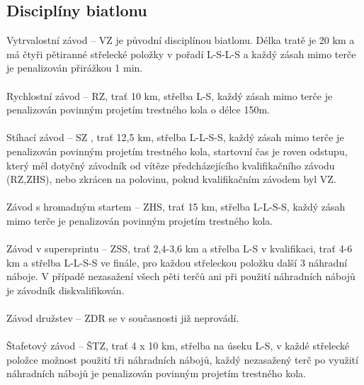 \documentclass{article}
\begin{document}
\subsection{Disciplíny biatlonu}
Vytrvalostní závod – VZ je původní disciplínou biatlonu. Délka tratě je 20 km a má čtyři pětiranné střelecké položky v pořadí L-S-L-S a každý zásah mimo terče je penalizován přirážkou 1 min.\\
\\
Rychlostní závod – RZ, trať 10 km, střelba L-S, každý zásah mimo terče je penalizován povinným projetím trestného kola o délce 150m.\\
\\
Stíhací závod – SZ , trať 12,5 km, střelba L-L-S-S, každý zásah mimo terče je penalizován povinným projetím trestného kola, startovní čas je roven odstupu, který měl dotyčný závodník od vítěze předcházejícího kvalifikačního závodu (RZ,ZHS), nebo zkrácen na polovinu, pokud kvalifikačním závodem byl VZ.\\
\\
Závod s hromadným startem – ZHS, trať 15 km, střelba L-L-S-S, každý zásah mimo terče je penalizován povinným projetím trestného kola.\\
\\
Závod v supersprintu – ZSS, trať 2,4-3,6 km a střelba L-S v kvalifikaci, trať 4-6 km a střelba L-L-S-S ve finále, pro každou střeleckou položku další 3 náhradní náboje. V případě nezasažení všech pěti terčů ani při použití náhradních nábojů je závodník diskvalifikován.\\
\\
Závod družstev – ZDR se v současnosti již neprovádí.\\
\\
Štafetový závod – ŠTZ, trať 4 x 10 km, střelba na úseku L-S, v každé střelecké položce možnost použití tři náhradních nábojů, každý nezasažený terč po využití náhradních nábojů je penalizován povinným projetím trestného kola.
\end{document}
